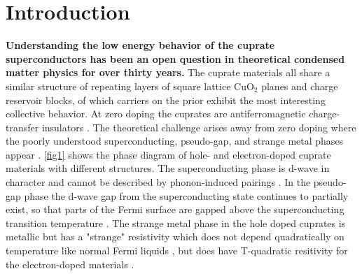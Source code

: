 \documentclass{article}
\begin{document}
\section{Introduction} 
\textbf{Understanding the low energy behavior of the cuprate superconductors has been an open question in theoretical condensed matter physics for over thirty years.}
The cuprate materials all share a similar structure of repeating layers of square lattice CuO$_2$ planes and charge reservoir blocks, of which carriers on the prior exhibit the most interesting collective behavior. 
At zero doping the cuprates are antiferromagnetic charge-transfer insulators \cite{RevModPhys.78.17}. 
The theoretical challenge arises away from zero doping where the poorly understood superconducting, pseudo-gap, and strange metal phases appear \cite{RevModPhys.84.1383}. 
\ref{fig1} shows the phase diagram of hole- and electron-doped cuprate materials with different structures. 
The superconducting phase is d-wave in character and cannot be described by phonon-induced pairings \cite{PhysRevLett.71.2134,PhysRevLett.69.1431,PhysRevB.43.2778, PhysRevB.47.11314, PhysRevLett.70.1553, RevModPhys.67.515, RevModPhys.77.109, RevModPhys.79.353, RevModPhys.75.473}. 
In the pseudo-gap phase the d-wave gap from the superconducting state continues to partially exist, so that parts of the Fermi surface are gapped above the superconducting transition temperature \cite{ROSSATMIGNOD199186, RevModPhys.77.721, PhysRevLett.75.4114, PhysRevB.61.9752}.
The strange metal phase in the hole doped cuprates is metallic but has a "strange" resistivity which does not depend quadratically on temperature like normal Fermi liquids \cite{PhysRevLett.69.2975}, but does have T-quadratic resitivity for the electron-doped materials \cite{1989PhyC..161..415T}. 
\end{document}
